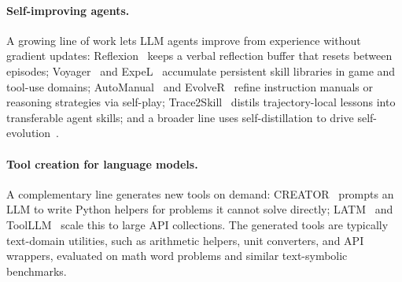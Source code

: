 \label{sec:related_work}

\paragraph{Self-improving agents.}
A growing line of work lets LLM agents improve from experience without gradient updates:
Reflexion~\citep{DBLP:conf/nips/ShinnCGNY23} keeps a verbal reflection buffer that resets
between episodes; Voyager~\citep{DBLP:journals/tmlr/WangX0MXZFA24} and
ExpeL~\citep{DBLP:conf/aaai/Zhao0XLLH24} accumulate persistent skill libraries in game and
tool-use domains; AutoManual~\citep{DBLP:conf/aaai/Zhao0XLLH24} and
EvolveR~\citep{DBLP:journals/corr/abs-2510-16079} refine instruction manuals or reasoning
strategies via self-play; Trace2Skill~\citep{DBLP:journals/corr/abs-2603-25158} distils trajectory-local
lessons into transferable agent skills; and a broader line uses self-distillation to drive
self-evolution~\citep{DBLP:journals/corr/abs-2604-01193,DBLP:conf/acl/SunCZXZY25,DBLP:conf/iclr/XuJNDP0L25}. 


\paragraph{Tool creation for language models.}
A complementary line generates new tools on demand:
CREATOR~\citep{DBLP:conf/emnlp/QianH0Q0J23} prompts an LLM to write Python helpers for problems it
cannot solve directly; LATM~\citep{DBLP:conf/iclr/Cai00CZ24} and ToolLLM~\citep{DBLP:conf/iclr/QinLYZYLLCTQZHT24} scale
this to large API collections. The generated tools are typically text-domain utilities,
such as arithmetic helpers, unit converters, and API wrappers, evaluated on math word
problems and similar text-symbolic benchmarks. 


